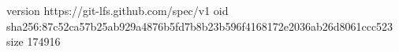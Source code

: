 version https://git-lfs.github.com/spec/v1
oid sha256:87c52ca57b25ab929a4876b5fd7b8b23b596f4168172e2036ab26d8061ccc523
size 174916

